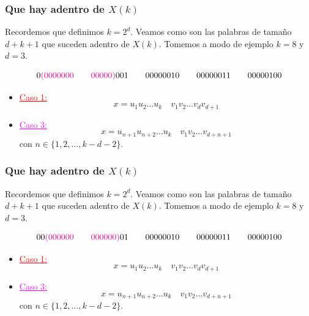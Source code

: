 \documentclass[10pt,mathserif]{beamer}%
\begin{document}
\begin{frame}
  \frametitle{Que hay adentro de $X(k)$}
  Recordemos que definimos $k = 2^d$.
  Veamos como son las palabras de tamaño $d + k + 1$ que suceden adentro de $X(k)$. Tomemos a modo de ejemplo $k = 8$ y $d = 3$.

  $$0\textcolor{magenta}{(0000000 \qquad 00000)} 001 \qquad 00000010 \qquad 00000011 \qquad 00000100$$

    \begin{itemize}
    \item \textcolor{red}{\underline{Caso 1:}}
    $$x = u_1 u_2 \dots u_k \quad v_1 v_2 \dots v_{d} v_{d + 1}$$  
    \par
    \item \textcolor{magenta}{\underline{Caso 3:}}
    $$x = u_{n+1} u_{n+2} \dots u_k \quad  v_1 v_2 \dots v_{d+n+1} $$
    con $n \in \{1,2,\dots ,k - d - 2\}$.
    \par
  \end{itemize}
\end{frame}

\begin{frame}
  \frametitle{Que hay adentro de $X(k)$}
  Recordemos que definimos $k = 2^d$.
  Veamos como son las palabras de tamaño $d + k + 1$ que suceden adentro de $X(k)$. Tomemos a modo de ejemplo $k = 8$ y $d = 3$.

  $$00\textcolor{magenta}{(000000 \qquad 000000)} 01 \qquad 00000010 \qquad 00000011 \qquad 00000100$$

    \begin{itemize}
    \item \textcolor{red}{\underline{Caso 1:}}
    $$x = u_1 u_2 \dots u_k \quad v_1 v_2 \dots v_{d} v_{d + 1}$$  
    \par
    \item \textcolor{magenta}{\underline{Caso 3:}}
    $$x = u_{n+1} u_{n+2} \dots u_k \quad  v_1 v_2 \dots v_{d+n+1} $$
    con $n \in \{1,2,\dots ,k - d - 2\}$.
    \par
  \end{itemize}
\end{frame}
\end{document}
